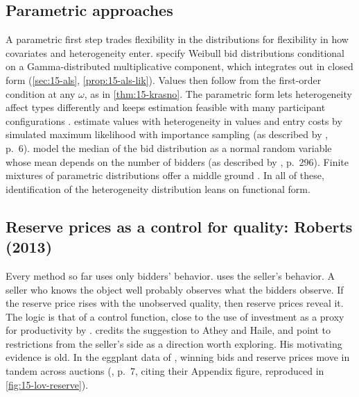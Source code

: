 \subsection{Parametric approaches}\label{sec:15-uh-param}

A parametric first step trades flexibility in the distributions for flexibility in how covariates
and heterogeneity enter. \citet{AtheyLevinSeira2011} specify Weibull bid distributions conditional on a
Gamma-distributed multiplicative component, which integrates out in closed form
(\cref{sec:15-als}, \cref{prop:15-als-lik}). Values then follow from the first-order condition at any
$\omega$, as in \cref{thm:15-krasno}. The parametric form lets heterogeneity affect types
differently and keeps estimation feasible with many participant configurations
\citep[Section 6.1.2]{AtheyHaile2007}. \citet{RobertsSweeting2013} estimate values with heterogeneity
in values and entry costs by simulated maximum likelihood with importance sampling (as described by
\citealp{Roberts2013}, p.~6). \citet{HongShum2002} model the median of the bid distribution as a normal
random variable whose mean depends on the number of bidders (as described by
\citealp{Krasnokutskaya2011}, p.~296). Finite mixtures of parametric distributions offer a middle
ground \citep[eqs. (6.7)--(6.9)]{AtheyHaile2007}. In all of these, identification of the
heterogeneity distribution leans on functional form.

\subsection{Reserve prices as a control for quality: Roberts (2013)}\label{sec:15-roberts}

Every method so far uses only bidders' behavior. \citet{Roberts2013} uses the seller's behavior. A
seller who knows the object well probably observes what the bidders observe. If the reserve price
rises with the unobserved quality, then reserve prices reveal it. The logic is that of a control
function, close to the use of investment as a proxy for productivity by \citet{OlleyPakes1996}.
\citet{Roberts2013} credits the suggestion to Athey and Haile, and \citet[footnote 56]{AtheyHaile2007}
point to restrictions from the seller's side as a direction worth exploring. His motivating evidence
is old. In the eggplant data of \citet{LaffontOssardVuong1995}, winning bids and reserve prices move
in tandem across auctions (\citealp{Roberts2013}, p.~7, citing their Appendix figure, reproduced in
\cref{fig:15-lov-reserve}).

